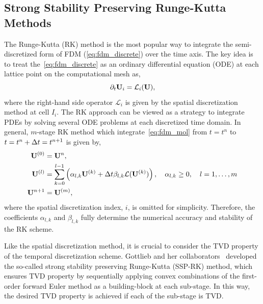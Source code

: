 \subsection{Strong Stability Preserving Runge-Kutta Methods}\label{subsec:ssprk}

The Runge-Kutta (RK) method is the most popular way to integrate
the semi-discretized form of FDM (\cref{eq:fdm_discrete}) over the time axis.
The key idea is to treat the~\cref{eq:fdm_discrete} as an ordinary differential equation (ODE)
at each lattice point on the computational mesh as,
\begin{equation}\label{eq:fdm_mol}
    \pd{\bU_{i}}{t} = \mathcal{L}_{i} (\bU),
\end{equation}
where the right-hand side operator \( \mathcal{L}_{i} \) is given by the spatial discretization method at cell \( I_{i} \).
The RK approach can be viewed as a strategy to integrate PDEs by solving several ODE problems at each discretized time domain.
In general, \( m \)-stage RK method which integrate~\cref{eq:fdm_mol}
from \( t = t^{n} \) to \( t = t^{n} + \dt = t^{n + 1} \) is given by,
\begin{equation}\label{eq:general_rk}
    \begin{split}
        \bU^{(0)} &= \bU^{n}, \\
        \bU^{(l)} &= \sum_{k=0}^{l -1} \left( \alpha_{l, k} \bU^{(k)} + \dt \beta_{l,k} \mathcal{L} (\bU^{(k)}) \right), \quad \alpha_{l,k} \geq 0, \quad l = 1, \dots, m \\
        \bU^{n + 1} &= \bU^{(m)},
    \end{split}
\end{equation}
where the spatial discretization index, \( i \), is omitted for simplicity.
Therefore, the coefficients \( \alpha_{l,k} \) and \( \beta_{l,k} \) fully determine
the numerical accuracy and stability of the RK scheme.

Like the spatial discretization method, it is crucial to consider the TVD property of the temporal discretization scheme.
Gottlieb and her collaborators~\cite{gottlieb1998total,gottlieb2001strong,gottlieb2011strong}
developed the so-called strong stability preserving Runge-Kutta (SSP-RK) method,
which ensures TVD property by sequentially applying convex combinations of the
first-order forward Euler method as a building-block at each sub-stage.
In this way, the desired TVD property is achieved if each of the sub-stage is TVD\@.

